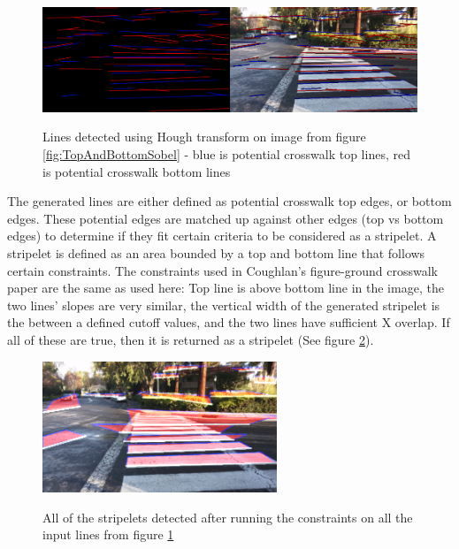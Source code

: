 \documentclass[12pt]{ucthesis}
\newcommand{\captionfonts}{\small\bf\ssp}
\begin{document}
\begin{figure}[h]
\begin{center}
\includegraphics[width=14cm]{HoughLinesAfterMerge.png}
\captionfonts
\caption[This is a figure]{Lines detected using Hough transform on image from figure \ref{fig:TopAndBottomSobel} - blue is potential crosswalk top lines, red is potential crosswalk bottom lines}
\label{fig:HoughLinesAfterMerge}
\end{center}
\end{figure}

The generated lines are either defined as potential crosswalk top edges, or bottom edges. These potential edges are matched up against other edges (top vs bottom edges) to determine if they fit certain criteria to be considered as a stripelet. A stripelet is defined as an area bounded by a top and bottom line that follows certain constraints. The constraints used in Coughlan's figure-ground crosswalk paper \cite{jamesm.coughlanhuiyingshen2006} are the same as used here: Top line is above bottom line in the image, the two lines' slopes are very similar, the vertical width of the generated stripelet is the between a defined cutoff values, and the two lines have sufficient X overlap. If all of these are true, then it is returned as a stripelet (See figure \ref{fig:UnculledStripelets}). 

\begin{figure}[h]
\begin{center}
\includegraphics[width=7cm]{UnculledStripelets.png}
\captionfonts
\caption[This is a figure]{All of the stripelets detected after running the constraints on all the input lines from figure \ref{fig:HoughLinesAfterMerge}}
\label{fig:UnculledStripelets}
\end{center}
\end{figure}
\end{document}

